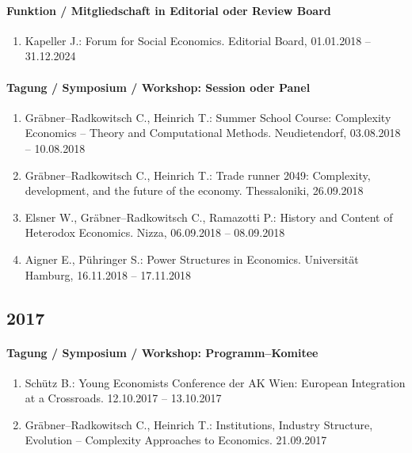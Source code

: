 \paragraph{Funktion / Mitgliedschaft in Editorial oder Review Board}
\begin{enumerate}[leftmargin=*, labelsep=0.5cm]
\item Kapeller J.: Forum for Social Economics. Editorial Board, 01.01.2018 -- 31.12.2024
\end{enumerate}
\paragraph{Tagung / Symposium / Workshop: Session oder Panel}
\begin{enumerate}[leftmargin=*, labelsep=0.5cm]
\item Gräbner--Radkowitsch C., Heinrich T.: Summer School Course: Complexity Economics -- Theory and Computational Methods. Neudietendorf, 03.08.2018 -- 10.08.2018
\item Gräbner--Radkowitsch C., Heinrich T.: Trade runner 2049: Complexity, development, and the future of the economy. Thessaloniki, 26.09.2018
\item Elsner W., Gräbner--Radkowitsch C., Ramazotti P.: History and Content of Heterodox Economics. Nizza, 06.09.2018 -- 08.09.2018
\item Aigner E., Pühringer S.: Power Structures in Economics. Universität Hamburg, 16.11.2018 -- 17.11.2018
\end{enumerate}\subsection*{2017}\paragraph{Tagung / Symposium / Workshop: Programm--Komitee}
\begin{enumerate}[leftmargin=*, labelsep=0.5cm]
\item Schütz B.: Young Economists Conference der AK Wien: European Integration at a Crossroads. 12.10.2017 -- 13.10.2017
\item Gräbner--Radkowitsch C., Heinrich T.: Institutions, Industry Structure, Evolution -- Complexity Approaches to Economics. 21.09.2017
\end{enumerate}
